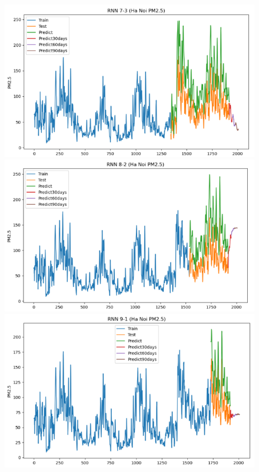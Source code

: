 \begin{figure}[H]
{\begin{adjustbox}{minipage=0.48\textwidth}
\begin{minipage}{0.3\textwidth}
            \end{minipage}\hfill
            \begin{minipage}{0.3\textwidth}
                \centering
                \includegraphics[width=\textwidth]{img/final/RNN/90D/RNN_7_3_HN.png}\\
                \includegraphics[width=\textwidth]{img/final/RNN/90D/RNN_8_2_HN.png}\\
                \includegraphics[width=\textwidth]{img/final/RNN/90D/RNN_9_1_HN.png}

\end{minipage}
\end{adjustbox}}
\end{figure}
